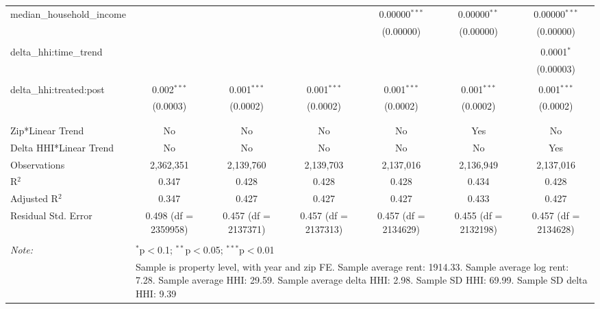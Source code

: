 \begin{table}[H]
{\begin{tabular}{@{\extracolsep{5pt}}lcccccc}
  median\_household\_income &  &  &  & 0.00000$^{***}$ & 0.00000$^{**}$ & 0.00000$^{***}$ \\  

   &  &  &  & (0.00000) & (0.00000) & (0.00000) \\  

   & & & & & & \\  

  delta\_hhi:time\_trend &  &  &  &  &  & 0.0001$^{*}$ \\  

   &  &  &  &  &  & (0.00003) \\  

   & & & & & & \\  

  delta\_hhi:treated:post & 0.002$^{***}$ & 0.001$^{***}$ & 0.001$^{***}$ & 0.001$^{***}$ & 0.001$^{***}$ & 0.001$^{***}$ \\  

   & (0.0003) & (0.0002) & (0.0002) & (0.0002) & (0.0002) & (0.0002) \\  

   & & & & & & \\  

 \hline \\[-1.8ex]  

 Zip*Linear Trend & No & No & No & No & Yes & No \\  

 Delta HHI*Linear Trend & No & No & No & No & No & Yes \\  

 Observations & 2,362,351 & 2,139,760 & 2,139,703 & 2,137,016 & 2,136,949 & 2,137,016 \\  

 R$^{2}$ & 0.347 & 0.428 & 0.428 & 0.428 & 0.434 & 0.428 \\  

 Adjusted R$^{2}$ & 0.347 & 0.427 & 0.427 & 0.427 & 0.433 & 0.427 \\  

 Residual Std. Error & 0.498 (df = 2359958) & 0.457 (df = 2137371) & 0.457 (df = 2137313) & 0.457 (df = 2134629) & 0.455 (df = 2132198) & 0.457 (df = 2134628) \\  

 \hline  

 \hline \\[-1.8ex]  

 \textit{Note:}  & \multicolumn{6}{l}{$^{*}$p$<$0.1; $^{**}$p$<$0.05; $^{***}$p$<$0.01} \\  

  & \multicolumn{6}{l}{Sample is property level, with year and zip FE. Sample average rent: 1914.33. Sample average log rent: 7.28. Sample average HHI: 29.59. Sample average delta HHI: 2.98. Sample SD HHI: 69.99. Sample SD delta HHI: 9.39} \\  

 \end{tabular}}  

 \end{table}  

